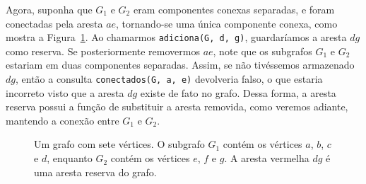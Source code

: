 Agora, suponha que $G_1$ e $G_2$ eram componentes conexas separadas, e foram  conectadas pela aresta $ae$, tornando-se uma única componente conexa, como mostra a Figura~\ref{fig:graph_with_reserve_edges}. Ao chamarmos \texttt{adiciona(G, d, g)}, guardaríamos a aresta $dg$ como reserva. Se posteriormente removermos $ae$, note que os subgrafos $G_1$ e $G_2$ estariam em duas componentes separadas. Assim, se não tivéssemos armazenado $dg$, então a consulta \texttt{conectados(G, a, e)} devolveria falso, o que estaria incorreto visto que a aresta $dg$ existe de fato no grafo. Dessa forma, a aresta reserva possui a função de substituir a aresta removida, como veremos adiante, mantendo a conexão entre $G_1$ e $G_2$.

\begin{figure}
    \centering
    \caption{Um grafo com sete vértices. O subgrafo $G_1$ contém os vértices $a$, $b$, $c$ e $d$, enquanto $G_2$ contém os vértices $e$, $f$ e $g$. A aresta vermelha $dg$ é uma aresta reserva do grafo.}
    \label{fig:graph_with_reserve_edges}
\end{figure}

